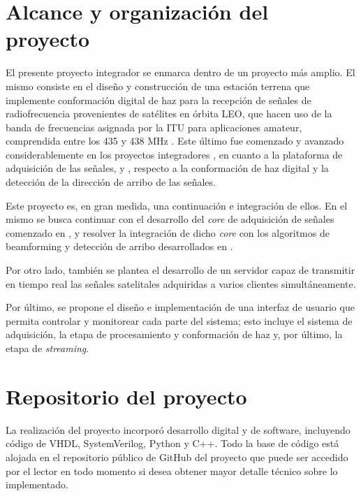 \documentclass[../../main.tex]{subfiles}
\begin{document}

\section{Alcance y organización del proyecto}
El presente proyecto integrador se enmarca dentro de un proyecto más amplio. El mismo consiste en el diseño y construcción de una estación terrena que implemente conformación digital de haz 
para la recepción de señales de radiofrecuencia provenientes de satélites en órbita LEO, que hacen uso de la banda de frecuencias asignada por la ITU para aplicaciones amateur, comprendida entre los 435 y 438 MHz \cite{itu-banda-amateur}.
Este último fue comenzado y avanzado considerablemente en los proyectos integradores \cite{proyecto-jose}, en cuanto a la plataforma de adquisición de las señales, y \cite{proyecto-grigo}, respecto a la conformación de haz digital y la detección de la dirección de arribo de las señales. 

Este proyecto es, en gran medida, una continuación e integración de ellos. En el mismo se busca continuar con el desarrollo del \textit{core} de adquisición de señales comenzado en \cite{proyecto-jose}, y resolver la integración de dicho \textit{core} con los algoritmos de beamforming y detección de arribo desarrollados en \cite{proyecto-grigo}.

Por otro lado, también se plantea el desarrollo de un servidor capaz de transmitir en tiempo real las señales satelitales adquiridas a varios clientes simultáneamente.

Por último, se propone el diseño e implementación de una interfaz de usuario que permita controlar y monitorear cada parte del sistema; esto incluye el sistema de adquisición, la etapa de procesamiento y conformación de haz y, por último, la etapa de \textit{streaming}.

\section{Repositorio del proyecto}
La realización del proyecto incorporó desarrollo digital y de software, incluyendo código de VHDL, SystemVerilog, Python y C++. Todo la base de código está alojada en el repositorio público de GitHub del proyecto \cite{github} que puede ser accedido por el lector en todo momento si desea obtener mayor detalle técnico sobre lo implementado.
\end{document}
